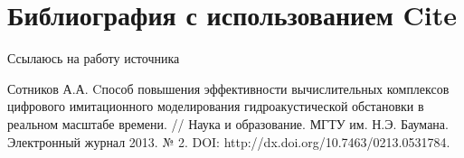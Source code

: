 \documentclass[a4paper, 14pt]{extarticle}
\begin{document}
    \graphicspath{{images/}{images2/}} %

    \author{М.А.Гейне}
    \bmstutitlelab

    \section{Библиография с использованием Cite}
    Ссылаюсь на работу источника \cite{Sotnikov}
    
    \begin{thebibliography}{1}
        Сотников А.А. Cпособ повышения эффективности вычислительных комплексов
        цифрового имитационного моделирования гидроакустической обстановки в
        реальном масштабе времени. // Наука и образование. МГТУ им. Н.Э. Баумана.
        Электронный журнал 2013. № 2. DOI: http://dx.doi.org/10.7463/0213.0531784.
        
    \end{thebibliography}
\end{document}
